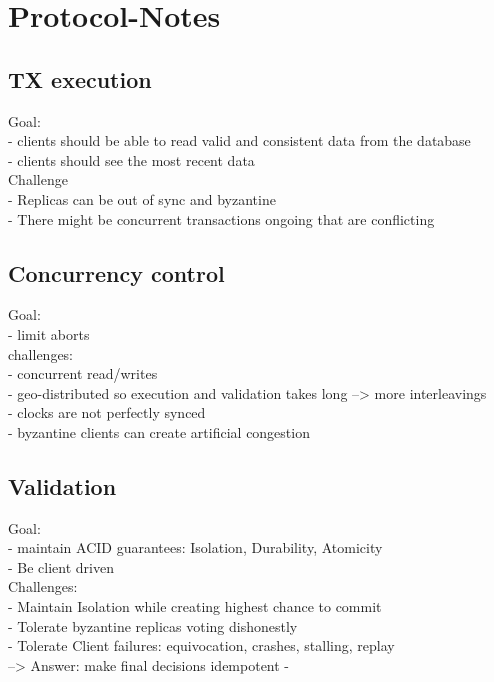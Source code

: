\section{Protocol-Notes}

\subsection{TX execution}
Goal:\\
- clients should be able to read valid and consistent data from the database\\
- clients should see the most recent data\\


Challenge\\
- Replicas can be out of sync and byzantine\\
- There might be concurrent transactions ongoing that are conflicting\\



\subsection{Concurrency control}
Goal: \\
- limit aborts\\

challenges:\\
- concurrent read/writes\\
- geo-distributed so execution and validation takes long --> more interleavings\\
- clocks are not perfectly synced\\
- byzantine clients can create artificial congestion\\


\subsection{Validation}
Goal:\\
- maintain ACID guarantees: Isolation, Durability, Atomicity\\
- Be client driven\\

Challenges:\\
- Maintain Isolation while creating highest chance to commit\\
- Tolerate byzantine replicas voting dishonestly\\
- Tolerate Client failures: equivocation, crashes, stalling, replay\\
--> Answer: make final decisions idempotent
-



